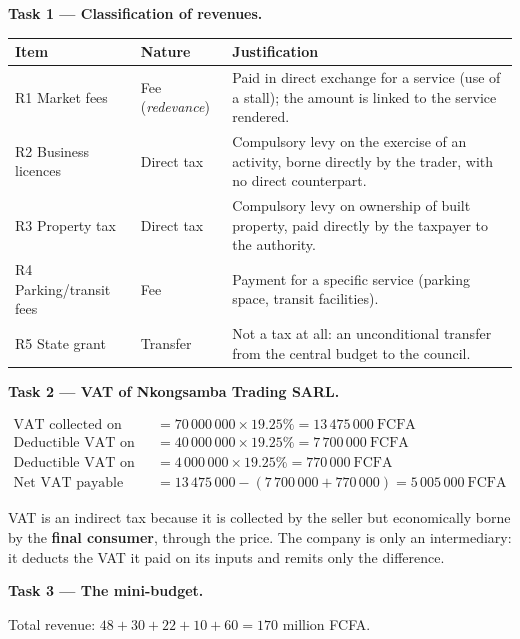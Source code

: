 \documentclass[11pt]{article}
\newcommand{\cle}[1]{{\popxbold\color{popdark}#1}}
\newcounter{popsec}
\newcounter{popsub}
\newcommand{\courssub}[1]{%
  \stepcounter{popsub}%
  \par\vspace{9pt}\noindent{\popxbold\fontsize{11.5}{13}\selectfont\color{popink}{\color{poporange}\thepopsec.\thepopsub}\hspace{6pt}#1}\par\nopagebreak\vspace{4pt}
}
\begin{document}
\courssub{Model answer}

\textbf{Task 1 — Classification of revenues.}

\begin{center}
\begin{tabularx}{\linewidth}{|l|l|X|}
\hline
\rowcolor{popblueL} \textbf{Item} & \textbf{Nature} & \textbf{Justification} \\
\hline
R1 Market fees & Fee (\emph{redevance}) & Paid in direct exchange for a service (use of a stall); the amount is linked to the service rendered. \\
\hline
R2 Business licences & Direct tax & Compulsory levy on the exercise of an activity, borne directly by the trader, with no direct counterpart. \\
\hline
R3 Property tax & Direct tax & Compulsory levy on ownership of built property, paid directly by the taxpayer to the authority. \\
\hline
R4 Parking/transit fees & Fee & Payment for a specific service (parking space, transit facilities). \\
\hline
R5 State grant & Transfer & Not a tax at all: an unconditional transfer from the central budget to the council. \\
\hline
\end{tabularx}
\end{center}

\textbf{Task 2 — VAT of Nkongsamba Trading SARL.}

\begin{align*}
\text{VAT collected on sales} &= 70\,000\,000 \times 19.25\% = 13\,475\,000\ \text{FCFA}\\
\text{Deductible VAT on goods} &= 40\,000\,000 \times 19.25\% = 7\,700\,000\ \text{FCFA}\\
\text{Deductible VAT on tricycle} &= 4\,000\,000 \times 19.25\% = 770\,000\ \text{FCFA}\\
\text{Net VAT payable} &= 13\,475\,000 - (7\,700\,000 + 770\,000) = 5\,005\,000\ \text{FCFA}
\end{align*}

VAT is an \cle{indirect tax} because it is collected by the seller but economically borne by the \textbf{final consumer}, through the price. The company is only an intermediary: it deducts the VAT it paid on its inputs and remits only the difference.

\textbf{Task 3 — The mini-budget.}

Total revenue: $48 + 30 + 22 + 10 + 60 = 170$ million FCFA.
\end{document}
